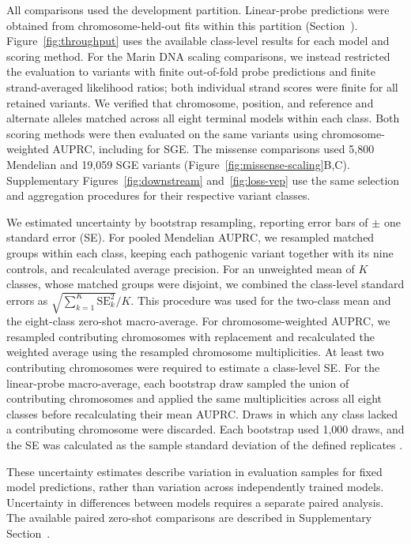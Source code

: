 \documentclass[a4paper,num-refs]{oup-contemporary}
\begin{document}
All comparisons used the development partition.
Linear-probe predictions were obtained from chromosome-held-out
fits within this partition (Section~).
Figure~\ref{fig:throughput} uses the available class-level results
for each model and scoring method.
For the Marin DNA scaling comparisons, we instead restricted the
evaluation to variants with finite out-of-fold probe predictions
and finite strand-averaged likelihood ratios; both individual
strand scores were finite for all retained variants.
We verified that chromosome, position, and reference and alternate
alleles matched across all eight terminal models within each class.
Both scoring methods were then evaluated on the same variants using
chromosome-weighted AUPRC, including for SGE.
The missense comparisons used 5,800 Mendelian and 19,059 SGE variants
(Figure~\ref{fig:missense-scaling}B,C).
Supplementary Figures~\ref{fig:downstream} and~\ref{fig:loss-vep}
use the same selection and aggregation procedures for their
respective variant classes.

We estimated uncertainty by bootstrap resampling, reporting error
bars of $\pm$ one standard error (SE).
For pooled Mendelian AUPRC, we resampled matched groups within each
class, keeping each pathogenic variant together with its nine
controls, and recalculated average precision.
For an unweighted mean of $K$ classes, whose matched groups were
disjoint, we combined the class-level standard errors as
$\sqrt{\sum_{k=1}^{K}\mathrm{SE}_k^2}/K$.
This procedure was used for the two-class mean and the eight-class
zero-shot macro-average.
For chromosome-weighted AUPRC, we resampled contributing chromosomes
with replacement and recalculated the weighted average using the
resampled chromosome multiplicities.
At least two contributing chromosomes were required to estimate
a class-level SE.
For the linear-probe macro-average, each bootstrap draw sampled
the union of contributing chromosomes and applied the same
multiplicities across all eight classes before recalculating their
mean AUPRC. Draws in which any class lacked a contributing
chromosome were discarded.
Each bootstrap used 1,000 draws, and the SE was calculated as the
sample standard deviation of the defined replicates
\citep{marindnabencheval,marindnaevo2metrics}.

These uncertainty estimates describe variation in evaluation samples
for fixed model predictions, rather than variation across
independently trained models.
Uncertainty in differences between models requires a separate
paired analysis. The available paired zero-shot comparisons are
described in Supplementary Section~.
\end{document}
